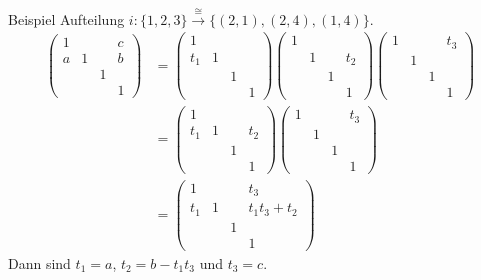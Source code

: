\begin{frame}[fragile]{Beispiel Aufteilung}
  $i:\{1,2,3\}\overset{\cong}{\longrightarrow}\{(2,1),(2,4),(1,4)\}$.
  \begin{align*}
    \begin{pmatrix}
      1 &  &  & c\\
      a & 1 &  & b\\
      &  & 1\\
      &  &  & 1
    \end{pmatrix}
        &=
    \begin{pmatrix}
      1\\
      t_1 & 1\\
      &  & 1\\
      &  &  & 1
    \end{pmatrix}
    \begin{pmatrix}
      1\\
      & 1 &  & t_2\\
      &  & 1\\
      &  &  & 1
    \end{pmatrix}
    \begin{pmatrix}
      1 &  &  & t_3\\
      & 1\\
      &  & 1\\
      &  &  & 1
    \end{pmatrix}
    \\ &=
    \begin{pmatrix}
      1\\
      t_1 & 1 &  & t_2\\
      &  & 1\\
      &  &  & 1
    \end{pmatrix}
    \begin{pmatrix}
      1 &  &  & t_3\\
      & 1\\
      &  & 1\\
      &  &  & 1
    \end{pmatrix}
    \\ &=
    \begin{pmatrix}
      1 &  &  & t_3\\
      t_1 & 1 &  & t_1t_3 + t_2\\
      &  & 1\\
      &  &  & 1
    \end{pmatrix}
  \end{align*}
  Dann sind $t_1=a$, $t_2=b-t_1t_3$ und $t_3=c$.
\end{frame}

